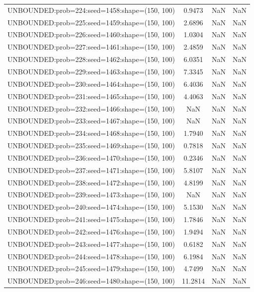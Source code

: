\begin{longtable}{lccc}
UNBOUNDED:prob=224:seed=1458:shape=(150, 100) &  0.9473 &   NaN &    NaN \\
UNBOUNDED:prob=225:seed=1459:shape=(150, 100) &  2.6896 &   NaN &    NaN \\
UNBOUNDED:prob=226:seed=1460:shape=(150, 100) &  1.0304 &   NaN &    NaN \\
UNBOUNDED:prob=227:seed=1461:shape=(150, 100) &  2.4859 &   NaN &    NaN \\
UNBOUNDED:prob=228:seed=1462:shape=(150, 100) &  6.0351 &   NaN &    NaN \\
UNBOUNDED:prob=229:seed=1463:shape=(150, 100) &  7.3345 &   NaN &    NaN \\
UNBOUNDED:prob=230:seed=1464:shape=(150, 100) &  6.4036 &   NaN &    NaN \\
UNBOUNDED:prob=231:seed=1465:shape=(150, 100) &  4.4063 &   NaN &    NaN \\
UNBOUNDED:prob=232:seed=1466:shape=(150, 100) &     NaN &   NaN &    NaN \\
UNBOUNDED:prob=233:seed=1467:shape=(150, 100) &     NaN &   NaN &    NaN \\
UNBOUNDED:prob=234:seed=1468:shape=(150, 100) &  1.7940 &   NaN &    NaN \\
UNBOUNDED:prob=235:seed=1469:shape=(150, 100) &  0.7818 &   NaN &    NaN \\
UNBOUNDED:prob=236:seed=1470:shape=(150, 100) &  0.2346 &   NaN &    NaN \\
UNBOUNDED:prob=237:seed=1471:shape=(150, 100) &  5.8107 &   NaN &    NaN \\
UNBOUNDED:prob=238:seed=1472:shape=(150, 100) &  4.8199 &   NaN &    NaN \\
UNBOUNDED:prob=239:seed=1473:shape=(150, 100) &     NaN &   NaN &    NaN \\
UNBOUNDED:prob=240:seed=1474:shape=(150, 100) &  5.1530 &   NaN &    NaN \\
UNBOUNDED:prob=241:seed=1475:shape=(150, 100) &  1.7846 &   NaN &    NaN \\
UNBOUNDED:prob=242:seed=1476:shape=(150, 100) &  1.9494 &   NaN &    NaN \\
UNBOUNDED:prob=243:seed=1477:shape=(150, 100) &  0.6182 &   NaN &    NaN \\
UNBOUNDED:prob=244:seed=1478:shape=(150, 100) &  6.1984 &   NaN &    NaN \\
UNBOUNDED:prob=245:seed=1479:shape=(150, 100) &  4.7499 &   NaN &    NaN \\
UNBOUNDED:prob=246:seed=1480:shape=(150, 100) & 11.2814 &   NaN &    NaN \\

\end{longtable}
